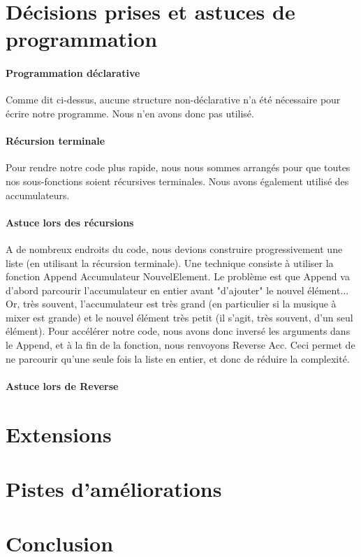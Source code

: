 \documentclass[12pt,a4paper]{article}
\begin{document}
\section{Décisions prises et astuces de programmation}
\paragraph{Programmation déclarative} Comme dit ci-dessus, aucune structure non-déclarative 
n'a été nécessaire pour écrire notre programme. Nous n'en avons donc pas utilisé.

\paragraph{Récursion terminale}
Pour rendre notre code plus rapide, nous nous sommes arrangés pour que toutes nos sous-fonctions
 soient récursives terminales. Nous avons également utilisé des accumulateurs.

\paragraph{Astuce lors des récursions}
A de nombreux endroits du code, nous devions construire progressivement une liste 
(en utilisant la récursion terminale). Une technique consiste à utiliser la fonction
{Append Accumulateur NouvelElement}. Le problème est que Append va d'abord parcourir
l'accumulateur en entier avant "d'ajouter" le nouvel élément... Or, très souvent, 
l'accumulateur est très grand (en particulier si la musique à mixer est grande) et 
le nouvel élément très petit (il s'agit, très souvent, d'un seul élément). Pour accélérer
notre code, nous avons donc inversé les arguments dans le Append, et à la fin de la 
fonction, nous renvoyons {Reverse Acc}. Ceci permet de ne parcourir qu'une seule fois 
la liste en entier, et donc de réduire la complexité.

\paragraph{Astuce lors de Reverse}


\section{Extensions}
\section{Pistes d'améliorations}
\section{Conclusion}
\end{document}

